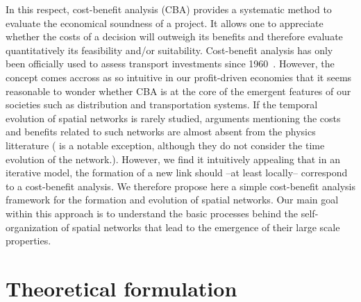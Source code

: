In this respect, cost-benefit analysis (CBA) provides a systematic method to evaluate the economical soundness of a project. It allows one to appreciate whether the costs of a decision will outweigh its benefits and therefore evaluate quantitatively its feasibility and/or suitability. Cost-benefit analysis has only been officially used to assess transport investments since 1960~\cite{Coburn:1960}. However, the concept comes accross as so intuitive in our profit-driven economies that it seems reasonable to wonder whether CBA is at the core of the emergent features of our societies such as distribution and transportation systems. If the temporal evolution of spatial networks is rarely studied, arguments mentioning the costs and benefits related to such networks are almost absent from the physics litterature (\cite{Popovic:2011} is a notable exception, although they do not consider the time evolution of the network.). However, we find it intuitively appealing that in an iterative model, the formation of a new link should --at least locally-- correspond to a cost-benefit analysis. We therefore propose here a simple cost-benefit analysis framework for the formation and evolution of spatial networks. Our main goal within this approach is to understand the basic processes behind the self-organization of spatial networks that lead to the emergence of their large scale properties.


\section{Theoretical formulation}

